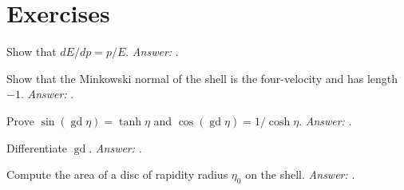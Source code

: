 \section*{Exercises}
\begin{exercise}Show that $dE/dp=p/E$. \emph{Answer:} .\end{exercise}
\begin{exercise}Show that the Minkowski normal of the shell is the four-velocity and has length $-1$. \emph{Answer:} .\end{exercise}
\begin{exercise}Prove $\sin(\operatorname{gd}\eta)=\tanh\eta$ and $\cos(\operatorname{gd}\eta)=1/\cosh\eta$. \emph{Answer:} .\end{exercise}
\begin{exercise}Differentiate $\operatorname{gd}$. \emph{Answer:} .\end{exercise}
\begin{exercise}Compute the area of a disc of rapidity radius $\eta_0$ on the shell. \emph{Answer:} .\end{exercise}

